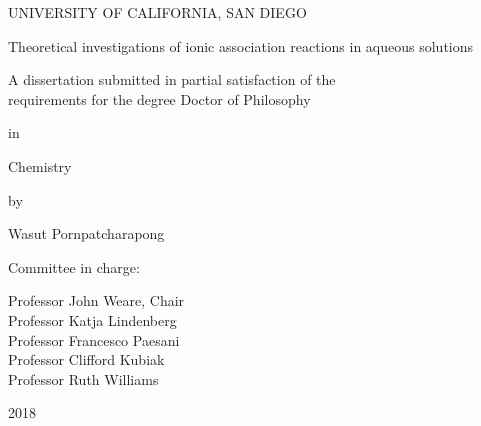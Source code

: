 \frontmatter

\titleformat{\chapter}[block]{\centering}{}{1em}{\MakeUppercase}
\titlespacing*{\chapter}{0pt}{0pt}{1em}

\pagestyle{fancy}
\fancyhf{}
\renewcommand{\headrulewidth}{0pt}
\fancyfoot[CE,CO]{\thepage}



\begin{titlepage}\begin{center}
    UNIVERSITY OF CALIFORNIA, SAN DIEGO

    \vspace{1cm}

    {Theoretical investigations of ionic association reactions in aqueous solutions}

    \vspace{1cm}

    {A dissertation submitted in partial satisfaction of the \\
    requirements for the degree Doctor of Philosophy}

    \vspace{1.3cm}

    in

    \vspace{0.7cm}

    Chemistry

    \vspace{1.3cm}

    by

    \vspace{0.7cm}

    Wasut Pornpatcharapong
\end{center}

\vspace{1.3cm}

\noindent Committee in charge:

\noindent\hspace{0.5in} Professor John Weare, Chair \\
\noindent\hspace*{0.5in} Professor Katja Lindenberg \\
\noindent\hspace*{0.5in} Professor Francesco Paesani \\
\noindent\hspace*{0.5in} Professor Clifford Kubiak \\
\noindent\hspace*{0.5in} Professor Ruth Williams

\vspace{0.7cm}

\begin{center}
    2018
\end{center}\end{titlepage}
